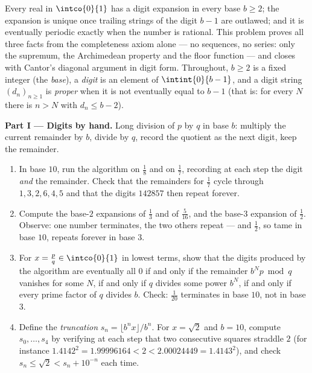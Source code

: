 \begin{problem}
\label{pb:b1:reals:1}
Every real in $\intco{0}{1}$ has a digit expansion in every base
$b \geq 2$; the expansion is unique once trailing strings of the
digit $b - 1$ are outlawed; and it is eventually periodic exactly
when the number is rational. This problem proves all three facts
from the completeness axiom alone --- no sequences, no series:
only the supremum, the Archimedean property and the floor function
--- and closes with Cantor's diagonal argument in digit form.
Throughout, $b \geq 2$ is a fixed integer (the \emph{base}), a
\emph{digit} is an element of $\intint{0}{b-1}$, and a digit
string $(d_n)_{n \geq 1}$ is \emph{proper} when it is not
eventually equal to $b - 1$ (that is: for every $N$ there is $n >
N$ with $d_n \leq b - 2$).

\medskip
\noindent\textbf{Part I --- Digits by hand.} Long division of $p$
by $q$ in base $b$: multiply the current remainder by $b$, divide
by $q$, record the quotient as the next digit, keep the remainder.
\begin{enumerate}
  \item In base $10$, run the algorithm on $\frac 18$ and on
        $\frac 17$, recording at each step the digit \emph{and}
        the remainder. Check that the remainders for $\frac 17$
        cycle through $1, 3, 2, 6, 4, 5$ and that the digits
        $142857$ then repeat forever.
  \item Compute the base-$2$ expansions of $\frac 13$ and of
        $\frac{5}{16}$, and the base-$3$ expansion of $\frac 12$.
        Observe: one number terminates, the two others repeat ---
        and $\frac 12$, so tame in base $10$, repeats forever in
        base $3$.
  \item For $x = \frac pq \in \intco{0}{1}$ in lowest terms, show
        that the digits produced by the algorithm are eventually
        all $0$ if and only if the remainder $b^N p \bmod q$
        vanishes for some $N$, if and only if $q$ divides some
        power $b^N$, if and only if every prime factor of $q$
        divides $b$. Check: $\frac{1}{20}$ terminates in base
        $10$, not in base $3$.
  \item Define the \emph{truncation} $s_n = \lfloor b^n x \rfloor
        / b^n$. For $x = \sqrt 2$ and $b = 10$, compute $s_0,
        \dots, s_4$ by verifying at each step that two
        consecutive squares straddle $2$ (for instance $1.4142^2
        = 1.99996164 < 2 < 2.00024449 = 1.4143^2$), and check
        $s_n \leq \sqrt 2 < s_n + 10^{-n}$ each time.
\end{enumerate}


\end{problem}
